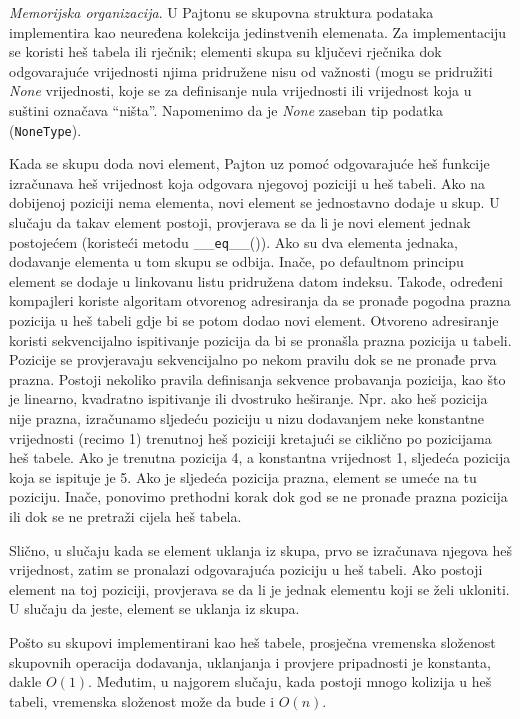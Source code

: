  
 


\textit{Memorijska organizacija}. U Pajtonu se skupovna struktura podataka implementira kao neuređena kolekcija jedinstvenih elemenata. Za imple\-menta\-ciju se koristi heš tabela ili rječnik; elementi skupa su ključevi rječnika dok odgovarajuće vrije\-dnosti njima pridružene nisu od važnosti (mogu se pridružiti \textit{None} vrijednosti, koje se za definisanje nula vrije\-dnosti ili vrijednost koja u suštini  označava ``ništa''. Napomenimo da je \emph{None} zaseban tip podatka (\texttt{NoneType}).  

Kada se skupu doda novi element, Pajton uz pomoć odgovarajuće heš funkcije izračunava   heš vrijednost koja odgovara  njegovoj  poziciji u heš tabeli. Ako na dobijenoj poziciji nema elementa, novi element se jednostavno dodaje u skup. U slučaju da takav element postoji, provjerava se da li je novi element jednak postojećem (koristeći metodu \_\_\texttt{eq}\_\_()). Ako su dva elementa jednaka,  dodavanje elementa u tom skupu se odbija. Inače, po defaultnom principu element se dodaje u linkovanu listu pridružena datom indeksu. Takođe, određeni kompajleri  
koriste algoritam  otvorenog adresiranja da se pronađe pogodna prazna pozicija u heš tabeli gdje bi se potom dodao novi element. 
Otvoreno adresiranje koristi sekvencijalno ispitivanje pozicija da bi se pronašla prazna pozicija u tabeli. Pozicije se provjeravaju sekvencijalno po nekom pravilu dok se ne pronađe prva prazna. Postoji nekoliko pravila  definisanja sekvence probavanja pozicija, kao što je linearno, kvadratno ispitiva\-nje ili dvostruko heširanje. Npr. ako heš pozicija nije prazna, izračunamo sljedeću poziciju u nizu dodavanjem neke konstantne vrije\-dnosti (recimo 1) trenutnoj heš poziciji kretajući se ciklično po pozici\-jama heš tabele. Ako je trenutna pozicija 4, a konstantna vrijednost 1, sljedeća pozicija koja se ispituje je 5. Ako je sljedeća pozicija prazna,  element se umeće na tu poziciju. Inače, ponovimo prethodni korak dok god se ne pronađe prazna pozicija ili dok se ne pretraži cijela heš tabela. 
 

Slično, u slučaju kada se element uklanja iz skupa, prvo se izraču\-nava njegova heš vrijednost, zatim se pronalazi odgovarajuća poziciju u heš tabeli. Ako postoji element na toj poziciji,  provjerava se da li je jednak elementu koji se želi ukloniti. U slučaju da jeste, element se uklanja iz skupa. %

Pošto su skupovi implementirani kao heš tabele, prosječna vreme\-nska složenost   skupovnih operacija  dodavanja, uklanjanja i provjere pripadnosti je konstanta, dakle $O(1)$. Međutim, u najgorem slučaju, kada postoji mnogo kolizija u heš tabeli, vremenska složenost može da bude i $O(n)$.

